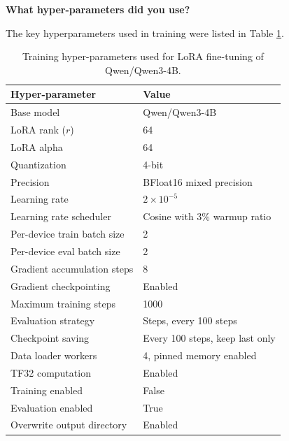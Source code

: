\documentclass{article}
\begin{document}
\textbf{What hyper-parameters did you use?}

The key hyperparameters used in training were listed in Table \ref{tab:hyperparams}.

\begin{table}[h!]
    \centering
    \caption{Training hyper-parameters used for LoRA fine-tuning of Qwen/Qwen3-4B.}
    \begin{tabular}{ l l }
        \hline
        \textbf{Hyper-parameter}    & \textbf{Value}                  \\
        \hline
        Base model                  & Qwen/Qwen3-4B                  \\
        LoRA rank ($r$)             & 64                              \\
        LoRA alpha                  & 64                              \\
        Quantization                & 4-bit                           \\
        Precision                   & BFloat16 mixed precision        \\
        Learning rate               & $2 \times 10^{-5}$              \\
        Learning rate scheduler     & Cosine with 3\% warmup ratio    \\
        Per-device train batch size & 2                               \\
        Per-device eval batch size  & 2                               \\
        Gradient accumulation steps & 8                               \\
        Gradient checkpointing      & Enabled                         \\
        Maximum training steps      & 1000                            \\
        Evaluation strategy         & Steps, every 100 steps          \\
        Checkpoint saving           & Every 100 steps, keep last only \\
        Data loader workers         & 4, pinned memory enabled        \\
        TF32 computation            & Enabled                         \\
        Training enabled            & False                           \\
        Evaluation enabled          & True                            \\
        Overwrite output directory  & Enabled                         \\
        \hline
    \end{tabular}
    \label{tab:hyperparams}
\end{table}
\end{document}
